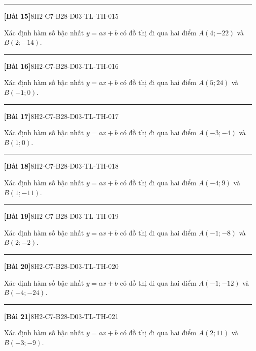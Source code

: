 \documentclass[12pt,a4paper]{article}
\newif\ifloigiai
\newenvironment{cauhoi}[2]{%
  \par\medskip\noindent\rule{\textwidth}{0.4pt}\par\nopagebreak
  \noindent\textbf{[#1]}\hfill{\scriptsize\ttfamily #2}\par\nopagebreak\smallskip}{\par}
\newcommand{\loigiai}[1]{\ifloigiai\par\smallskip\noindent\textit{Lời giải.} #1\par\fi}
\begin{document}
\begin{cauhoi}{Bài 15}{8H2-C7-B28-D03-TL-TH-015}
Xác định hàm số bậc nhất $y=ax+b$ có đồ thị đi qua hai điểm $A(4;-22)$ và $B(2;-14)$.
\loigiai{Thay toạ độ $A$, $B$ vào $y=ax+b$ ta có hệ $-22=4a+b$ và $-14=2a+b$. Trừ hai vế: $a=\dfrac{-22+14}{4-2}=-4$. Suy ra $b=-22+4\cdot(4)=-6$. Vậy $y=-4x-6$.}
\end{cauhoi}
\begin{cauhoi}{Bài 16}{8H2-C7-B28-D03-TL-TH-016}
Xác định hàm số bậc nhất $y=ax+b$ có đồ thị đi qua hai điểm $A(5;24)$ và $B(-1;0)$.
\loigiai{Thay toạ độ $A$, $B$ vào $y=ax+b$ ta có hệ $24=5a+b$ và $0=-a+b$. Trừ hai vế: $a=\dfrac{24-0}{5+1}=4$. Suy ra $b=24-4\cdot(5)=4$. Vậy $y=4x+4$.}
\end{cauhoi}
\begin{cauhoi}{Bài 17}{8H2-C7-B28-D03-TL-TH-017}
Xác định hàm số bậc nhất $y=ax+b$ có đồ thị đi qua hai điểm $A(-3;-4)$ và $B(1;0)$.
\loigiai{Thay toạ độ $A$, $B$ vào $y=ax+b$ ta có hệ $-4=-3a+b$ và $0=a+b$. Trừ hai vế: $a=\dfrac{-4-0}{-3-1}=1$. Suy ra $b=-4-1\cdot(-3)=-1$. Vậy $y=x-1$.}
\end{cauhoi}
\begin{cauhoi}{Bài 18}{8H2-C7-B28-D03-TL-TH-018}
Xác định hàm số bậc nhất $y=ax+b$ có đồ thị đi qua hai điểm $A(-4;9)$ và $B(1;-11)$.
\loigiai{Thay toạ độ $A$, $B$ vào $y=ax+b$ ta có hệ $9=-4a+b$ và $-11=a+b$. Trừ hai vế: $a=\dfrac{9+11}{-4-1}=-4$. Suy ra $b=9+4\cdot(-4)=-7$. Vậy $y=-4x-7$.}
\end{cauhoi}
\begin{cauhoi}{Bài 19}{8H2-C7-B28-D03-TL-TH-019}
Xác định hàm số bậc nhất $y=ax+b$ có đồ thị đi qua hai điểm $A(-1;-8)$ và $B(2;-2)$.
\loigiai{Thay toạ độ $A$, $B$ vào $y=ax+b$ ta có hệ $-8=-a+b$ và $-2=2a+b$. Trừ hai vế: $a=\dfrac{-8+2}{-1-2}=2$. Suy ra $b=-8-2\cdot(-1)=-6$. Vậy $y=2x-6$.}
\end{cauhoi}
\begin{cauhoi}{Bài 20}{8H2-C7-B28-D03-TL-TH-020}
Xác định hàm số bậc nhất $y=ax+b$ có đồ thị đi qua hai điểm $A(-1;-12)$ và $B(-4;-24)$.
\loigiai{Thay toạ độ $A$, $B$ vào $y=ax+b$ ta có hệ $-12=-a+b$ và $-24=-4a+b$. Trừ hai vế: $a=\dfrac{-12+24}{-1+4}=4$. Suy ra $b=-12-4\cdot(-1)=-8$. Vậy $y=4x-8$.}
\end{cauhoi}
\begin{cauhoi}{Bài 21}{8H2-C7-B28-D03-TL-TH-021}
Xác định hàm số bậc nhất $y=ax+b$ có đồ thị đi qua hai điểm $A(2;11)$ và $B(-3;-9)$.
\loigiai{Thay toạ độ $A$, $B$ vào $y=ax+b$ ta có hệ $11=2a+b$ và $-9=-3a+b$. Trừ hai vế: $a=\dfrac{11+9}{2+3}=4$. Suy ra $b=11-4\cdot(2)=3$. Vậy $y=4x+3$.}
\end{cauhoi}
\end{document}
